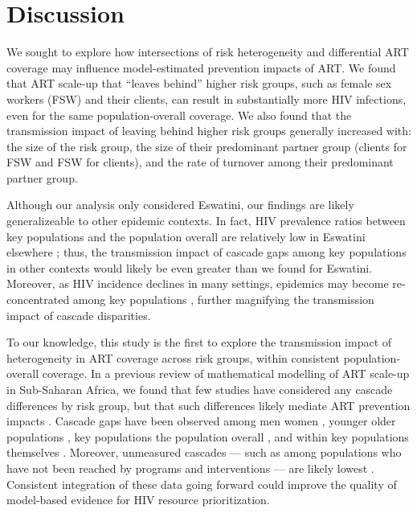 \section{Discussion}\label{disc}
We sought to explore how intersections of risk heterogeneity and differential ART coverage
may influence model-estimated prevention impacts of ART.
We found that ART scale-up that ``leaves behind'' higher risk groups,
such as female sex workers (FSW) and their clients,
can result in substantially more HIV infections,
even for the same population-overall coverage.
We also found that the transmission impact of leaving behind higher risk groups
generally increased with:
the size of the risk group,
the size of their predominant partner group (\ie clients for FSW and FSW for clients),
and the rate of turnover among their predominant partner group.
\par
Although our analysis only considered Eswatini,
our findings are likely generalizeable to other epidemic contexts.
In fact, HIV prevalence ratios between key populations and the population overall
are relatively low in Eswatini \vs elsewhere \cite{Baral2012,Hessou2019};
thus, the transmission impact of cascade gaps among key populations in other contexts
would likely be even greater than we found for Eswatini.
Moreover, as HIV incidence declines in many settings,
epidemics may become re-concentrated among key populations \cite{Brown2019,Garnett2021},
further magnifying the transmission impact of cascade disparities.
\par
To our knowledge, this study is the first to explore the transmission impact of
heterogeneity in ART coverage across risk groups, within consistent population-overall coverage.
In a previous review of mathematical modelling of ART scale-up in Sub-Saharan Africa,
we found that few studies have considered any cascade differences by risk group,
but that such differences likely mediate ART prevention impacts \cite{Knight2022sr}.
Cascade gaps have been observed among men \vs women \cite{Quinn2019,Green2020},
younger \vs older populations \cite{Green2020,Lebelonyane2021},
key populations \vs the population overall \cite{Hakim2018},
and within key populations themselves \cite{Mayanja2018,Jaffer2022}.
Moreover, unmeasured cascades
--- such as among populations who have not been reached by programs and interventions ---
are likely lowest \cite{Hakim2018,Boothe2021}.
Consistent integration of these data going forward could
improve the quality of model-based evidence for HIV resource prioritization.
